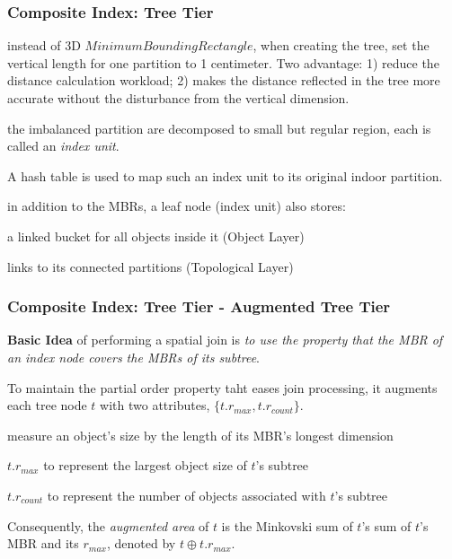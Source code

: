 \begin{frame}
\frametitle{Composite Index: Tree Tier}

\begin{fitemize}
  \item instead of 3D $Minimum Bounding Rectangle$, when creating the tree, set the vertical length for one partition to 1 centimeter. Two advantage: 1) reduce the distance calculation workload; 2) makes the distance reflected in the tree more accurate without the disturbance from the vertical dimension.
  \item the imbalanced partition are decomposed to small but regular region, each is called an \emph{index unit}.
  \item A hash table is used to map such an index unit to its original indoor partition.
  \item in addition to the MBRs, a leaf node (index unit) also stores:
    \begin{sitemize}
      \item a linked bucket for all objects inside it (Object Layer)
      \item links to its connected partitions (Topological Layer)
    \end{sitemize}
\end{fitemize}

\end{frame}


\begin{frame}
\frametitle{Composite Index: Tree Tier - Augmented Tree Tier}

\textbf{Basic Idea} of performing a spatial join is \emph{to use the property that the MBR of an index node covers the MBRs of its subtree}.

\vspace{20pt}

To maintain the partial order property taht eases join processing, it augments each tree node $t$ with two attributes, $\{ t.r_{max}, t.r_{count} \}$.
\begin{fitemize}
  \item measure an object's size by the length of its MBR's longest dimension
  \item $t.r_{max}$ to represent the largest object size of $t$'s subtree
  \item $t.r_{count}$ to represent the number of objects associated with $t$'s subtree
\end{fitemize}

\vspace{20pt}

Consequently, the \emph{augmented area} of $t$ is the Minkovski sum of $t$'s sum of $t$'s MBR and its $r_{max}$, denoted by $t \oplus t.r_{max}$.

\end{frame}

